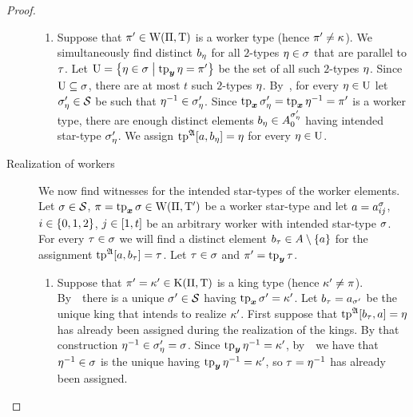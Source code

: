 \begin{proof}
\begin{description}
\begin{enumerate}
  \item
  Suppose that ${\pi'} \in \mathrm{W}(\Pi,\mathrm{T})$ is a worker type (hence ${\pi'} \neq
  \kappa$).
  We simultaneously find distinct $b_{\eta}$ for all $2$-types $\eta \in
  \sigma$ that are parallel to $\tau$.
  Let $\mathrm{U} = \left\{\eta\in \sigma\mathrel{}\middle|\mathrel{}\operatorname{tp}_{\bm{y}}\eta = {\pi'}\right\}$ be the set of all
  such $2$-types $\eta$.
  Since $\mathrm{U} \subseteq \sigma$, there are at most $t$ such $2$-types $\eta$.
  By~, for every $\eta \in \mathrm{U}$ let $\sigma'_\eta \in \mathcal{S}$ be
  such that $\eta^{-1} \in \sigma'_\eta$.
  Since $\operatorname{tp}_{\bm{x}}{\sigma_{\eta}'} = \operatorname{tp}_{\bm{x}}\eta^{-1} = {\pi'}$ is a worker type, there
  are enough distinct elements $b_{\eta} \in A^{{\sigma_{\eta}'}}_{0}$ having
  intended star-type ${\sigma_{\eta}'}$.
  We assign $\operatorname{tp}^{\mathfrak{A}}[a,b_{\eta}] = \eta$ for every $\eta \in \mathrm{U}$.
  \end{enumerate}
  \item[Realization of workers]
  We now find witnesses for the intended star-types of the worker elements.
  Let $\sigma \in \mathcal{S}$, $\pi = \operatorname{tp}_{\bm{x}}\sigma \in \mathrm{W}(\Pi,{\mathrm{T}'})$ be a worker
  star-type 
  and let $a = a^{\sigma}_{i j}$, $i \in \left\{0,1,2\right\}$, $j \in [1,t]$ be
  an arbitrary worker with intended star-type $\sigma$.
  For every $\tau \in \sigma$ we will find a distinct element $b_{\tau} \in
  A \setminus \left\{a\right\}$ for the assignment $\operatorname{tp}^{\mathfrak{A}}[a,b_{\tau}] = \tau$.
  Let $\tau \in \sigma$ and ${\pi'} = \operatorname{tp}_{\bm{y}}\tau$.
  \begin{enumerate}
    \item 
    Suppose that ${\pi'} = {\kappa'} \in \mathrm{K}(\Pi,\mathrm{T})$ is a king type (hence
    ${\kappa'} \neq \pi$). By~~there is a unique ${\sigma'} \in \mathcal{S}$
    having $\operatorname{tp}_{\bm{x}}{\sigma'} = {\kappa'}$.
    Let $b_{\tau} = a_{{\sigma'}}$ be the unique king that intends to realize
    ${\kappa'}$. 
    First suppose that $\operatorname{tp}^{\mathfrak{A}}[b_{\tau},a] = \eta$ has already
    been assigned during the realization of the kings. By that construction
    $\eta^{-1} \in \sigma'_\eta = \sigma$. Since $\operatorname{tp}_{\bm{y}}\eta^{-1} = {\kappa'}$,
    by~~we have that $\eta^{-1} \in \sigma$ is the unique having
    $\operatorname{tp}_{\bm{y}}\eta^{-1} = {\kappa'}$, so $\tau = \eta^{-1}$ has already been
    assigned.
    

\end{enumerate}
\end{description}
\end{proof}

